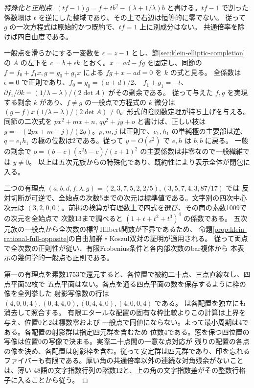 \begin{proof}[特殊化と正則点]
$(tf-1)g=f+tb^2-(\lambda+1/\lambda)b$ と書ける。$tf-1$ で割った係数環は
$t$ を逆にした整域であり、その上で右辺は恒等的に零でない。
従って $g$ の一次方程式は原始的かつ既約で、$tf=1$ 上に別成分はない。
共通倍率を除けば四自由度である。

一般点を滑らかにする一変数を $\epsilon=z-1$ とし、節\ref{sec:klein-elliptic-completion}の
$A$ の左下を $c=b+\epsilon k$ とおく。$x=ad-fg$ を固定し、同節の
$f=f_0+f_1x,g=g_0+g_1x$ による $fg+x-ad=0$ を $k$ の式と見る。
全係数は $\epsilon=0$ で正則であり、$f_0=g_0=(a+d)/2$、
$f_1+g_1=-t$、$\partial f_1/\partial k=(1/\lambda-\lambda)/(2\det A)$ がその剰余である。
従って与えた $f,g$ を実現する剰余 $k$ があり、$f\ne g$ の一般点で方程式の
$k$ 微分は $(g-f)x(1/\lambda-\lambda)/(2\det A)\ne0$。形式的陰関数定理が持ち上げを与える。
同節の二次式を $p x^2+m x+n$, $q y^2+j y+o$ と書けば、正しい枝は
$y=-(2px+m+j)/(2q)$。$p,m,j$ は正則で、$e_1,h_1$ の単純極の主要部は逆、
$q=e_1h_1$ の極の位数は2である。従って $y=O(\epsilon^2)$ で $e,h$ は $b,b$ に戻る。
一般の剰余で $o=(b-c)(z^2b-c)/(z+1)^2$ の主要係数は非零なので一般繊維では $y\ne0$。
以上は五次元族からの特殊化であり、既約性により表示全体が閉包に入る。

二つの有理点 $(a,b,d,f,\lambda,g)=(2,3,7,5,2,2/5),(3,5,7,4,3,87/17)$ では
反対切断が可逆で、全始点の次数5までの次元は標準値である。文字別の四次中心次元は
$(3,2,0,0)$。前掲の検算が有理数上で四式を選び、その商の素数1009での次元を全始点で
次数13まで調べると $(1+t+t^2+t^3)^4$ の係数である。
五次元族の一般点から全次数の標準Hilbert関数が下界であるため、
命題\ref{prop:klein-rational-full-opposite}の自由加群・Koszul双対の証明が適用される。
従って両点で全次数の正則性が従い、有限Frobenius条件と各内部次数のbar複体から
本表示の幾何学的一般点も正則である。

第一の有理点を素数1753で還元すると、各位置で被約二十点、三点直線なし、四点平面52枚で
五点平面はない。各点を通る四点平面の数を保存するように枠の像を全列挙した
射影写像数の行は $(4,0,0,4),(0,4,4,0),(0,4,4,0),(4,0,0,4)$ である。
 は各配置を独立にも消去して照合する。
有限エタールな配置の固有な枠比較よりこの計算は上界を与え、位置0と2は標数零および
一般点で同値にならない。よって最小周期は4である。各配置の射影群は指定四元群を含むため
位数4である。窓を保つ四位置の写像は位置0の写像で決まる。実際二十点間の一意な点対応が
残りの配置の各点の像を決め、各配置は射影枠を含む。従って安定群は四元群であり、印を忘れる
ファイバーも有限である。厚い角の共通倍率以外の連続な対角残余がないことは、薄い
48語の文字指数行列の階数12と、上の角の文字指数差がその整数行格子に入ることから従う。
\end{proof}
